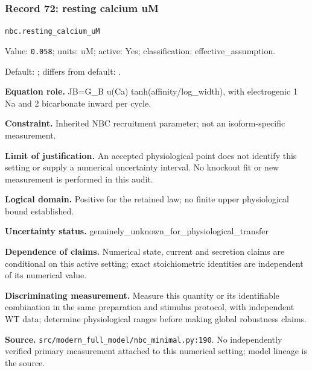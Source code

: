 \subsubsection*{Record 72: resting calcium uM}
{\small \nolinkurl{nbc.resting_calcium_uM}\par

Value: \texttt{0.058}; units: uM; active: Yes; classification: effective\_assumption.\par

Default: ; differs from default: .\par

\textbf{Equation role.} JB=G\_B u(Ca) tanh(affinity/log\_width), with electrogenic 1 Na and 2 bicarbonate inward per cycle.\par

\textbf{Constraint.} Inherited NBC recruitment parameter; not an isoform-specific measurement.\par

\textbf{Limit of justification.} An accepted physiological point does not identify this setting or supply a numerical uncertainty interval. No knockout fit or new measurement is performed in this audit.\par

\textbf{Logical domain.} Positive for the retained law; no finite upper physiological bound established.\par

\textbf{Uncertainty status.} genuinely\_unknown\_for\_physiological\_transfer\par

\textbf{Dependence of claims.} Numerical state, current and secretion claims are conditional on this active setting; exact stoichiometric identities are independent of its numerical value.\par

\textbf{Discriminating measurement.} Measure this quantity or its identifiable combination in the same preparation and stimulus protocol, with independent WT data; determine physiological ranges before making global robustness claims.\par

\textbf{Source.} \nolinkurl{src/modern_full_model/nbc_minimal.py:190}. No independently verified primary measurement attached to this numerical setting; model lineage is the source.\par}

